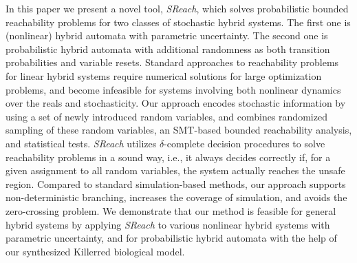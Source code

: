 In this paper we present a novel tool, {\it SReach}, which solves probabilistic bounded reachability problems for two classes of stochastic hybrid systems. The first one is (nonlinear) hybrid automata with parametric uncertainty. The second one is probabilistic hybrid automata with additional randomness as both transition probabilities and variable resets. Standard approaches to reachability problems for linear hybrid systems require numerical solutions for large optimization problems, and become infeasible for systems involving both nonlinear dynamics over the reals and stochasticity. Our approach encodes stochastic information by using a set of newly introduced random variables, and combines randomized sampling of these random variables, an SMT-based bounded reachability analysis, 
and statistical tests. {\it SReach} utilizes $\delta$-complete decision procedures 
to solve reachability problems in a sound way, i.e., it always decides correctly if, for a given
assignment to all random variables, the system actually reaches the unsafe region.
Compared to standard simulation-based methods, our approach supports 
non-deterministic branching, increases the coverage of simulation, and avoids the
zero-crossing problem. We demonstrate that our method is feasible for general
hybrid systems by applying {\it SReach} to
various nonlinear hybrid systems with parametric uncertainty, and for probabilistic hybrid automata with the help of our synthesized  Killerred biological model.
